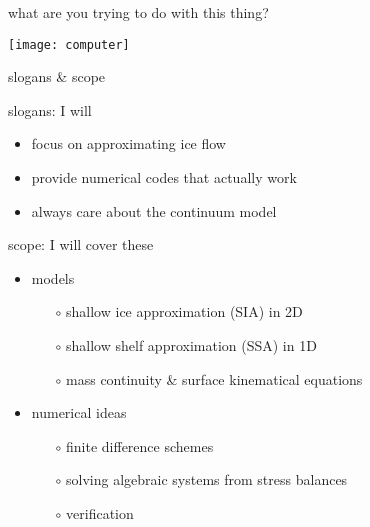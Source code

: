 


\begin{frame}{what are you trying to do with this thing?}

\begin{center}
\texttt{[image: computer]}
\end{center}
\end{frame}


\begin{frame}{slogans \& scope}

slogans: I will
  \begin{itemize}
  \item \alert{focus on approximating ice flow}
  \item \alert{provide numerical codes that actually work}
  \item \alert{always care about the continuum model}
  \end{itemize}
\medskip

scope: I will cover these
  \begin{itemize}
  \item models

    \begin{itemize}
    \item[$\circ$] shallow ice approximation (SIA) in 2D
    \item[$\circ$] shallow shelf approximation (SSA) in 1D
    \item[$\circ$] mass continuity \& surface kinematical equations
    \end{itemize}

  \item numerical ideas

    \begin{itemize}
    \item[$\circ$] finite difference schemes
    \item[$\circ$] solving algebraic systems from stress balances
    \item[$\circ$] verification
    \end{itemize}
  \end{itemize}
\end{frame}


